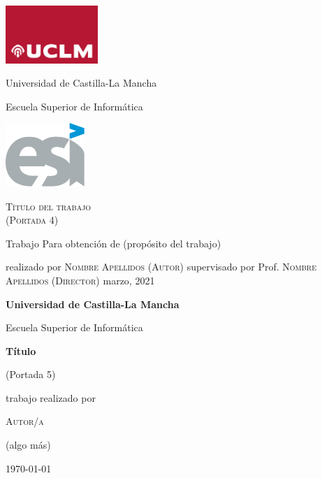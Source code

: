 \documentclass[12pt,a4paper]{report}
\begin{document}
\begin{titlepage}
    \centering %
	\includegraphics[width=3.5cm]{./figs/uclm_logo}
	\hfill
	\parbox{.5\linewidth}{%
		\centering
		{\LARGE Universidad de Castilla-La Mancha\par}
		\vspace{.05\textheight}
		{\large Escuela Superior de Informática\par}
	}
	\hfill
	\includegraphics[width=3cm]{./figs/esi_logo}
	\par
    \par\vspace{.15\textheight}
    {\huge\textsc{Título del trabajo \\
     (Portada 4)}\par}
    \Large
    \par\vspace{.1\textheight}
    Trabajo
    \medbreak
    Para obtención de
    (propósito del trabajo)
    \par\vspace{.08\textheight}
    realizado por
    \medbreak
    \textsc{Nombre Apellidos (Autor)}
    \bigbreak
    supervisado por
    \medbreak
    Prof. \textsc{Nombre Apellidos (Director)}
    \vfill
    \noindent%
    \small \hfill marzo, 2021 
\end{titlepage}


\begin{titlepage}
    \begin{center}
    	\LARGE
    	{\bfseries Universidad de Castilla-La Mancha\par}
    	Escuela Superior de Informática\par
    	\vspace{4cm}
    	{\huge\bfseries Título\par}
    	{\small (Portada 5)}
    	\vspace{3cm}
    	\par
    \end{center}
	\hfill\begin{minipage}{.5\linewidth}
		\normalsize
		trabajo realizado por\par
		\textsc{Autor/a}\par
		(algo más)
	\end{minipage}
	\vfill
	\centering	\today
\end{titlepage}
\end{document}
